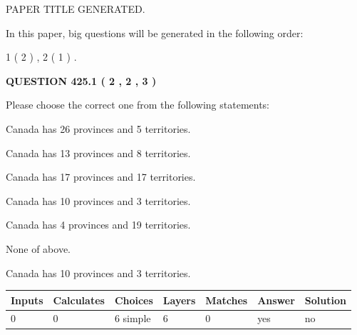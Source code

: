 \documentclass[12pt]{article}
\begin{document}
   
   
   
   
   
 \vspace{0.2in}
 
 
 
 
   
   
 PAPER TITLE GENERATED.
   
   
   
\vspace{0.2in}
   
In this paper, big questions will be generated in the following order: 
   
   
   1 ( 2 )
 ,
   2 ( 1 )
 .
  
\vspace{0.2in}
  
{\textbf{\Large{QUESTION
425.1 
 ( 2 , 2 , 3 )
}}}
  
  
Please choose the correct one from the following statements:
 
 
Canada has  26 provinces and  5 territories.
 
 
Canada has  13 provinces and  8 territories.
 
 
Canada has  17 provinces and  17 territories.
 
 
Canada has 10  provinces and 3 territories.
 
 
Canada has   4 provinces and  19 territories.
 
 
 None of above.
 
 
\noindent{}
 
 
Canada has 10  provinces and 3 territories.
 
 
\noindent{}
 
 
   
   
   
   
\noindent\begin{tabular}{|l|l|l|l|l|l|l|}
 \hline
Inputs & Calculates & Choices & Layers & Matches & Answer & Solution \\ \hline
 0  & 
 0  & 
 6
  simple  
  & 
 6  & 
 0  & 
  yes & 
  no 
  \\ \hline
 \end{tabular}
   
\end{document}
